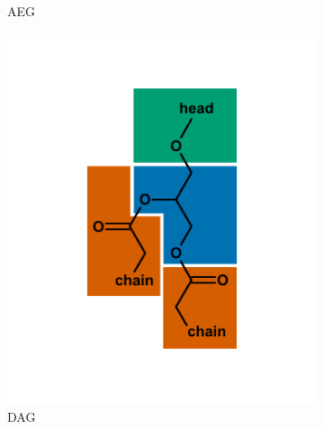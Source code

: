 {\begin{figure}[p]
\begin{subfigure}[b]{.45\linewidth}
    	\caption{AEG}
        \label{fig:AEG}
    \end{subfigure}
    \begin{subfigure}[b]{.45\linewidth}
        	\includegraphics[width=\linewidth]{figs_ch1/DAG}
    	\caption{DAG}
        \label{fig:DAG}
    \end{subfigure}
    \begin{subfigure}[b]{.45\linewidth}

\end{subfigure}
\end{figure}}
